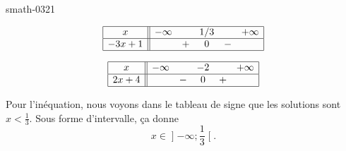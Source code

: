 
\begin{corrige}{smath-0321}

    \begin{multicols}{2}
    \begin{equation*}
        \begin{array}[]{|c||ccccc|}
            \hline
             x&-\infty&&1/3&&+\infty\\
              \hline
              -3x+1&&+&0&-&\\ 
              \hline 
               \end{array}
           \end{equation*}


    \begin{equation*}
        \begin{array}[]{|c||ccccc|}
            \hline
             x&-\infty&&-2&&+\infty\\
              \hline
              2x+4&&-&0&+&\\ 
              \hline 
               \end{array}
           \end{equation*}

    \end{multicols}
    Pour l'inéquation, nous voyons dans le tableau de signe que les solutions sont \( x<\frac{1}{ 3 }\). Sous forme d'intervalle, ça donne
    \begin{equation}
        x\in\mathopen] -\infty ; \frac{1}{ 3 } \mathclose[.
    \end{equation}

\end{corrige}
